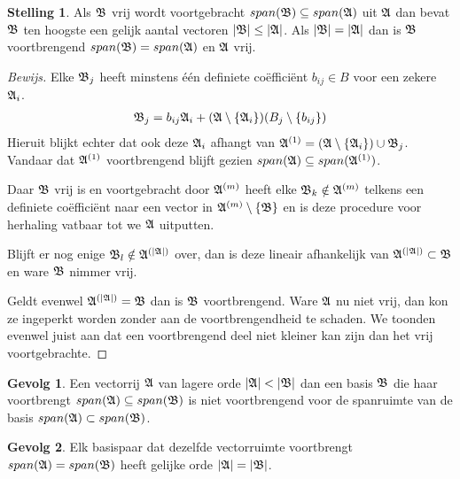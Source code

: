 \documentclass{amsart}
\theoremstyle{definition}
\newtheorem{thm}{Stelling}[section]
\newtheorem{csq}{Gevolg}[section]
\newenvironment{bewijs}{\begin{proof}[Bewijs]}{\end{proof}}
\newcommand{\setsm}[1]{\{{#1}\}}
\newcommand{\without}[1]{\setminus\setsm{#1}}
\newcommand{\abs}[1]{\lvert{#1}\rvert}
\newcommand{\vecrow}[1][a]{\mathfrak{\MakeUppercase{#1}}}
\newcommand{\rvec}[2][i]{{#2}_{#1}}
\newcommand{\rvecr}[2][i]{\rvec[#1]{\vecrow[#2]}}
\begin{document}
\begin{thm}
	Als $\vecrow[b]$ vrij wordt voortgebracht $span(\vecrow[b]) \subseteq span(\vecrow)$ uit $\vecrow$ dan bevat $\vecrow[b]$ ten hoogste een gelijk aantal vectoren $\abs{\vecrow[b]} \leq \abs\vecrow$.
	Als $\abs{\vecrow[b]} = \abs\vecrow$ dan is $\vecrow[b]$ voortbrengend $span(\vecrow[b]) = span(\vecrow)$ en $\vecrow$ vrij.
	\begin{bewijs}
		Elke $\vecrow[b]_j$ heeft minstens één definiete coëfficiënt $b_{ij} \in B$ voor een zekere $\vecrow_i$.
		\begin{align*}
			\vecrow[b]_j = b_{ij}\vecrow_i + (\vecrow \without{\vecrow_i})(B_j  \without{b_{ij}})
		\end{align*}
		Hieruit blijkt echter dat ook deze $\vecrow_i$ afhangt van  $\vecrow^{(1)} = \left(\vecrow \without{\vecrow_i}\right) \cup \rvecr[j]{b}$.
		Vandaar dat $\vecrow^{(1)}$ voortbrengend blijft gezien $span(\vecrow) \subseteq span(\vecrow^{(1)})$.

		Daar $\vecrow[b]$ vrij is en voortgebracht door $\vecrow^{(m)}$ heeft elke $\rvecr[k]{b} \notin \vecrow^{(m)}$ telkens een definiete coëfficiënt naar een vector in $\vecrow^{(m)}\without{\vecrow[b]}$
		en is deze procedure voor herhaling vatbaar tot we $\vecrow$ uitputten.

		Blijft er nog enige $\vecrow[b]_l \notin \vecrow^{(\abs{\vecrow})}$ over,
		dan is deze lineair afhankelijk van $\vecrow^{(\abs\vecrow)} \subset \vecrow[b]$ en ware $\vecrow[b]$ nimmer vrij.

		Geldt evenwel $\vecrow^{(\abs{\vecrow})} = \vecrow[b]$ dan is $\vecrow[b]$ voortbrengend.
		Ware $\vecrow$ nu niet vrij, dan kon ze ingeperkt worden zonder aan de voortbrengendheid te schaden.
		We toonden evenwel juist aan dat een voortbrengend deel niet kleiner kan zijn dan het vrij voortgebrachte.
	\end{bewijs}
\end{thm}

\begin{csq}
	Een vectorrij $\vecrow$ van lagere orde $\abs\vecrow < \abs{\vecrow[b]}$ dan een basis $\vecrow[b]$ die haar voortbrengt $span(\vecrow) \subseteq span(\vecrow[b])$ is niet voortbrengend voor de spanruimte van de basis $span(\vecrow) \subset span(\vecrow[b])$.
\end{csq}

\begin{csq}
	Elk basispaar dat dezelfde vectorruimte voortbrengt $span(\vecrow) = span(\vecrow[b])$ heeft gelijke orde $\abs\vecrow = \abs{\vecrow[b]}$.
\end{csq}
\end{document}
